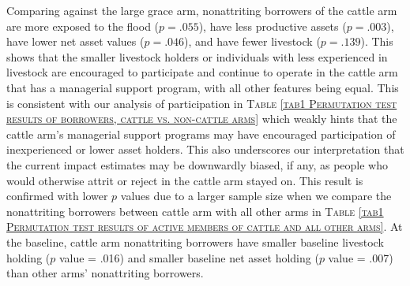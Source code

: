 	Comparing against the \textsf{large grace} arm, nonattriting borrowers of the \textsf{cattle} arm are more exposed to the flood ($p=.055$), have less productive assets ($p=.003$), have lower net asset values ($p=.046$), and have fewer livestock ($p=.139$). This shows that the smaller livestock holders or individuals with less experienced in livestock are encouraged to participate and continue to operate in the \textsf{cattle} arm that has a managerial support program, with all other features being equal. This is consistent with our analysis of participation in \textsc{\normalsize Table \ref{tab1 Permutation test results of borrowers, cattle vs. non-cattle arms}} which weakly hints that the \textsf{cattle} arm's managerial support programs may have encouraged participation of inexperienced or lower asset holders. This also underscores our interpretation that the current impact estimates may be downwardly biased, if any, as people who would otherwise attrit or reject in the \textsf{cattle} arm stayed on. This result is confirmed with lower $p$ values due to a larger sample size when we compare the nonattriting borrowers between \textsf{cattle} arm with all other arms in \textsc{\normalsize Table \ref{tab1 Permutation test results of active members of cattle and all other arms}}. At the baseline, \textsf{cattle} arm nonattriting borrowers have smaller baseline livestock holding ($p$ value = .016) and smaller baseline net asset holding ($p$ value = .007) than other arms' nonattriting borrowers. 

	

